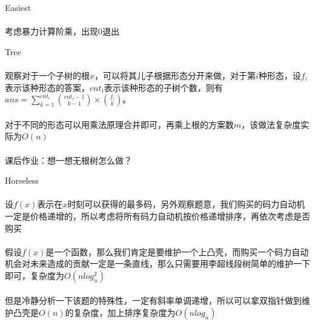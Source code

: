 \documentclass[UTF8]{ctexart}
\begin{document}
\begin{center}Easiest\end{center}
\paragraph{}考虑暴力计算阶乘，出现$0$退出
\begin{center}Tree\end{center}
\paragraph{}观察对于一个子树的根$x$，可以将其儿子根据形态分开来做，对于第$i$种形态，设$f_i$表示该种形态的答案，$cnt_i$表示该种形态的子树个数，则有$ans=\sum_{k=1}^{cnt_i}\binom{cnt_i-1}{k-1}\times \binom{f_i}{k}$。
\paragraph{}对于不同的形态可以用乘法原理合并即可，再乘上根的方案数$m$，该做法复杂度实际为$O(n)$
\paragraph{}课后作业：想一想无根树怎么做？
\begin{center}Horseless\end{center}
\paragraph{}设$f(x)$表示在$x$时刻可以获得的最多码，另外观察题意，我们购买的码力自动机一定是价格递增的，所以考虑将所有码力自动机按价格递增排序，再依次考虑是否购买
\paragraph{}假设$f(x)$是一个函数，那么我们肯定是要维护一个上凸壳，而购买一个码力自动机会对未来造成的贡献一定是一条直线，那么只需要用李超线段树简单的维护一下即可，复杂度为$O(nlog^2_n)$
\paragraph{}但是冷静分析一下该题的特殊性，一定有斜率单调递增，所以可以拿双指针做到维护凸壳是$O(n)$的复杂度，加上排序复杂度为$O(nlog_n)$
\end{document}
